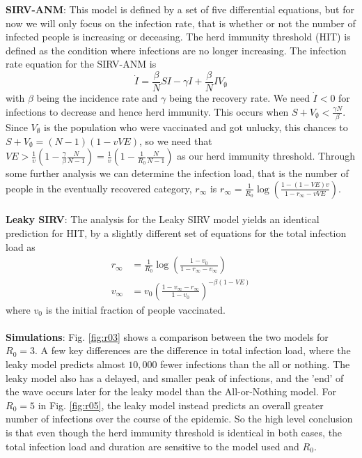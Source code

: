 \documentclass[11pt]{article}
\begin{document}
\begin{enumerate}
\begin{enumerate}[label=\alph*.]
\begin{tcolorbox}
		\textbf{SIRV-ANM}:
		This model is defined by a set of five differential equations, but for now we will only focus on the infection rate, that is whether or not the number of infected people is increasing or deceasing. The herd immunity threshold (HIT) is defined as the condition where infections are no longer increasing. The infection rate equation for the SIRV-ANM is 
		\begin{equation*}
			\dot{I}=\frac{\beta}{N}SI-\gamma I + \frac{\beta}{N} I V_{\emptyset}
		\end{equation*}
		with $\beta$ being the incidence rate and $\gamma$ being the recovery rate. We need $\dot{I}<0$ for infections to decrease and hence herd immunity. This occurs when $S+V_{\emptyset}<\frac{\gamma N}{\beta}$. Since $V_\emptyset$ is the population who were vaccinated and got unlucky, this chances to $S+V_\emptyset=(N-1)(1-vVE)$, so we need that $VE>\frac{1}{v}\left(1-\frac{\gamma}{\beta}\frac{N}{N-1}\right)=\frac{1}{v}\left(1-\frac{1}{R_0}\frac{N}{N-1}\right)$ as our herd immunity threshold. Through some further analysis we can determine the infection load, that is the number of people in the eventually recovered category, $r_\infty$ is $r_\infty = \frac{1}{R_0}\log\left(\frac{1-(1-VE)v}{1-r_\infty-vVE}\right)$.\\ \\
		\textbf{Leaky SIRV}:  The analysis for the Leaky SIRV model yields an identical prediction for HIT, by a slightly different set of equations for the total infection load as
		\begin{align*}
			r_\infty&=\frac{1}{R_0}\log\left(\frac{1-v_0}{1-r_\infty-v_\infty}\right)\\
			v_\infty&=v_0\left(\frac{1-v_\infty-r_\infty}{1-v_0}\right)^{-\beta(1-VE)}
		\end{align*}
		where $v_0$ is the initial fraction of people vaccinated. \\ \\
		\textbf{Simulations}: Fig. \ref{fig:r03} shows a comparison between the two models for $R_0=3$. A few key differences are the difference in total infection load, where the leaky model predicts almost $10,000$ fewer infections than the all or nothing. The leaky model also has a delayed, and smaller peak of infections, and the 'end' of the wave occurs later for the leaky model than the All-or-Nothing model. For $R_0=5$ in Fig. \ref{fig:r05}, the leaky model instead predicts an overall greater number of infections over the course of the epidemic. So the high level conclusion is that even though the herd immunity threshold is identical in both cases, the total infection load and duration are sensitive to the model used and $R_0$.
	\end{tcolorbox}




\end{enumerate}
\end{enumerate}
\end{document}
